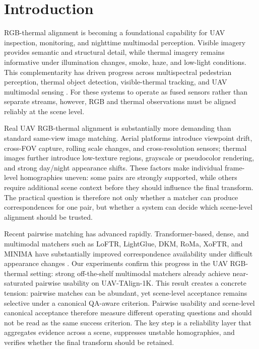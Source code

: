 
\section{Introduction}

RGB-thermal alignment is becoming a foundational capability for UAV inspection, monitoring, and
nighttime multimodal perception. Visible imagery provides semantic and structural detail, while
thermal imagery remains informative under illumination changes, smoke, haze, and low-light
conditions. This complementarity has driven progress across multispectral pedestrian perception,
thermal object detection, visible-thermal tracking, and UAV multimodal sensing
\cite{hwang2015kaist,flir2018thermal,jia2021llvip,liu2022tardal,sun2022dronevehicle,zhang2022vtuav,li2022lasher,jiang2023antiuav}.
For these systems to operate as fused sensors rather than separate streams, however, RGB and
thermal observations must be aligned reliably at the scene level.

Real UAV RGB-thermal alignment is substantially more demanding than standard same-view image
matching. Aerial platforms introduce viewpoint drift, cross-FOV capture, rolling scale changes, and
cross-resolution sensors; thermal images further introduce low-texture regions, grayscale or
pseudocolor rendering, and strong day/night appearance shifts. These factors make individual
frame-level homographies uneven: some pairs are strongly supported, while others require additional
scene context before they should influence the final transform. The practical question is therefore
not only whether a matcher can produce correspondences for one pair, but whether a system can
decide which scene-level alignment should be trusted.

Recent pairwise matching has advanced rapidly. Transformer-based, dense, and multimodal matchers
such as LoFTR, LightGlue, DKM, RoMa, XoFTR, and MINIMA have substantially improved correspondence
availability under difficult appearance changes
\cite{sarlin2020superglue,sun2021loftr,chen2022aspanformer,lindenberger2023lightglue,edstedt2023dkm,edstedt2024roma,tuzcuoglu2024xoftr,ren2025minima}.
Our experiments confirm this progress in the UAV RGB-thermal setting: strong off-the-shelf
multimodal matchers already achieve near-saturated pairwise usability on UAV-TAlign-1K. This result
creates a concrete tension: pairwise matches can be abundant, yet scene-level acceptance remains
selective under a canonical QA-aware criterion. Pairwise usability and scene-level canonical
acceptance therefore measure different operating questions and should not be read as the same
success criterion. The key step is a reliability layer that aggregates evidence across a scene,
suppresses unstable homographies, and verifies whether the final transform should be retained.

